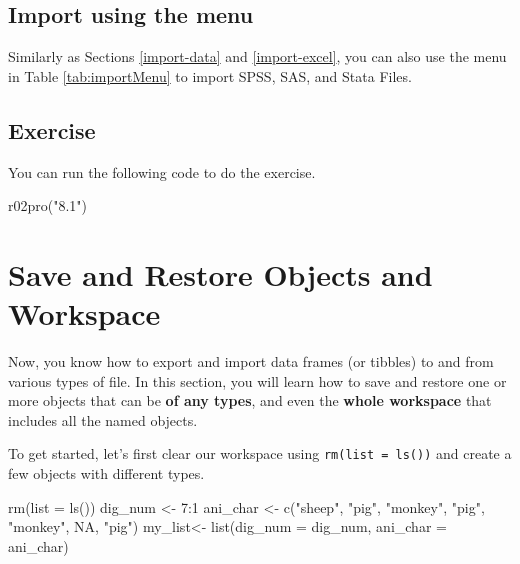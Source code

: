 \documentclass[
]{book}
\newenvironment{Shaded}{\begin{snugshade}}{\end{snugshade}}
\newcommand{\AttributeTok}[1]{\textcolor[rgb]{0.77,0.63,0.00}{#1}}
\newcommand{\ConstantTok}[1]{\textcolor[rgb]{0.00,0.00,0.00}{#1}}
\newcommand{\DecValTok}[1]{\textcolor[rgb]{0.00,0.00,0.81}{#1}}
\newcommand{\FunctionTok}[1]{\textcolor[rgb]{0.00,0.00,0.00}{#1}}
\newcommand{\NormalTok}[1]{#1}
\newcommand{\OtherTok}[1]{\textcolor[rgb]{0.56,0.35,0.01}{#1}}
\newcommand{\SpecialCharTok}[1]{\textcolor[rgb]{0.00,0.00,0.00}{#1}}
\newcommand{\StringTok}[1]{\textcolor[rgb]{0.31,0.60,0.02}{#1}}
\begin{document}
\hypertarget{import-using-the-menu}{%
\subsection{Import using the menu}\label{import-using-the-menu}}

Similarly as Sections \ref{import-data} and \ref{import-excel}, you can also use the menu in Table \ref{tab:importMenu} to import SPSS, SAS, and Stata Files.

\hypertarget{exercise-9}{%
\subsection{Exercise}\label{exercise-9}}

You can run the following code to do the exercise.

\begin{Shaded}
\begin{Highlighting}[]
\FunctionTok{r02pro}\NormalTok{(}\StringTok{"8.1"}\NormalTok{)}
\end{Highlighting}
\end{Shaded}

\hypertarget{save-object}{%
\section{Save and Restore Objects and Workspace}\label{save-object}}

Now, you know how to export and import data frames (or tibbles) to and from various types of file. In this section, you will learn how to save and restore one or more objects that can be \textbf{of any types}, and even the \textbf{whole workspace} that includes all the named objects.

To get started, let's first clear our workspace using \texttt{rm(list\ =\ ls())} and create a few objects with different types.

\begin{Shaded}
\begin{Highlighting}[]
\FunctionTok{rm}\NormalTok{(}\AttributeTok{list =} \FunctionTok{ls}\NormalTok{())}
\NormalTok{dig\_num }\OtherTok{\textless{}{-}} \DecValTok{7}\SpecialCharTok{:}\DecValTok{1}
\NormalTok{ani\_char }\OtherTok{\textless{}{-}} \FunctionTok{c}\NormalTok{(}\StringTok{"sheep"}\NormalTok{, }\StringTok{"pig"}\NormalTok{, }\StringTok{"monkey"}\NormalTok{, }\StringTok{"pig"}\NormalTok{, }\StringTok{"monkey"}\NormalTok{, }\ConstantTok{NA}\NormalTok{, }\StringTok{"pig"}\NormalTok{)}
\NormalTok{my\_list}\OtherTok{\textless{}{-}} \FunctionTok{list}\NormalTok{(}\AttributeTok{dig\_num =}\NormalTok{ dig\_num, }\AttributeTok{ani\_char =}\NormalTok{ ani\_char)}
\end{Highlighting}
\end{Shaded}
\end{document}
